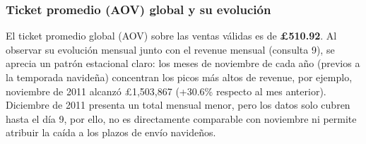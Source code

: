 \subsubsection*{Ticket promedio (AOV) global y su evolución}

El ticket promedio global (AOV) sobre las ventas válidas es de \textbf{£510.92}. Al observar su evolución mensual junto con el revenue mensual (consulta 9), se aprecia un patrón estacional claro: los meses de noviembre de cada año (previos a la temporada navideña) concentran los picos más altos de revenue, por ejemplo, noviembre de 2011 alcanzó £1{,}503{,}867 (+30.6\% respecto al mes anterior). Diciembre de 2011 presenta un total mensual menor, pero los datos solo cubren hasta el día 9, por ello, no es directamente comparable con noviembre ni permite atribuir la caída a los plazos de envío navideños.
